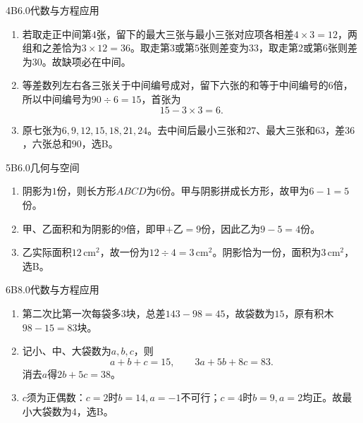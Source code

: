 \begin{solution}{4}{B}{6.0}{代数与方程应用}
\begin{enumerate}[label=\textbf{Step \arabic*:},leftmargin=*]
  \item 若取走正中间第\(4\)张，留下的最大三张与最小三张对应项各相差\(4\times3=12\)，两组和之差恰为\(3\times12=36\)。取走第\(3\)或第\(5\)张则差变为\(33\)，取走第\(2\)或第\(6\)张则差为\(30\)。故缺项必在中间。
  \item 等差数列左右各三张关于中间编号成对，留下六张的和等于中间编号的\(6\)倍，所以中间编号为\(90\div6=15\)，首张为
  \[
    15-3\times3=6.
  \]
  \item 原七张为\(6,9,12,15,18,21,24\)。去中间后最小三张和\(27\)、最大三张和\(63\)，差\(36\)，六张总和\(90\)，选B。
\end{enumerate}
\end{solution}

\begin{solution}{5}{B}{6.0}{几何与空间}
\begin{enumerate}[label=\textbf{Step \arabic*:},leftmargin=*]
  \item 阴影为\(1\)份，则长方形\(ABCD\)为\(6\)份。甲与阴影拼成长方形，故甲为\(6-1=5\)份。
  \item 甲、乙面积和为阴影的\(9\)倍，即甲\(+\)乙\(=9\)份，因此乙为\(9-5=4\)份。
  \item 乙实际面积\(12\,\mathrm{cm}^2\)，故一份为\(12\div4=3\,\mathrm{cm}^2\)。阴影恰为一份，面积为\(3\,\mathrm{cm}^2\)，选B。
\end{enumerate}
\end{solution}

\begin{solution}{6}{B}{8.0}{代数与方程应用}
\begin{enumerate}[label=\textbf{Step \arabic*:},leftmargin=*]
  \item 第二次比第一次每袋多\(3\)块，总差\(143-98=45\)，故袋数为\(15\)，原有积木\(98-15=83\)块。
  \item 记小、中、大袋数为\(a,b,c\)，则
  \[
    a+b+c=15,\qquad 3a+5b+8c=83.
  \]
  消去\(a\)得\(2b+5c=38\)。
  \item \(c\)须为正偶数：\(c=2\)时\(b=14,a=-1\)不可行；\(c=4\)时\(b=9,a=2\)均正。故最小大袋数为\(4\)，选B。
\end{enumerate}
\end{solution}


